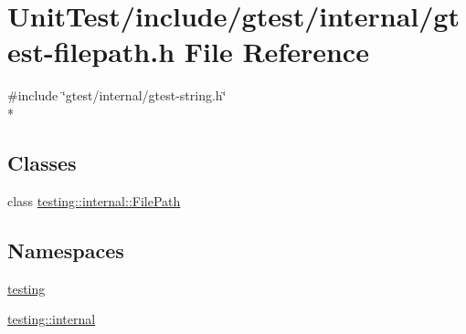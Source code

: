 \hypertarget{gtest-filepath_8h}{\section{Unit\+Test/include/gtest/internal/gtest-\/filepath.h File Reference}
\label{gtest-filepath_8h}
}
{\ttfamily \#include \char`\"{}gtest/internal/gtest-\/string.\+h\char`\"{}}\\*
\subsection*{Classes}
\begin{DoxyCompactItemize}
\item 
class \hyperlink{classtesting_1_1internal_1_1_file_path}{testing\+::internal\+::\+File\+Path}
\end{DoxyCompactItemize}
\subsection*{Namespaces}
\begin{DoxyCompactItemize}
\item 
 \hyperlink{namespacetesting}{testing}
\item 
 \hyperlink{namespacetesting_1_1internal}{testing\+::internal}
\end{DoxyCompactItemize}
